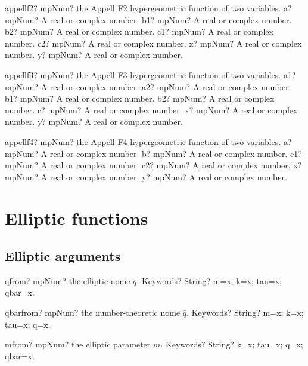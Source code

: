 \documentclass[12pt,a4paper,openany]{book}
\begin{document}
\begin{mpFunctionsExtract}
\mpFunctionSeven
{appellf2? mpNum? the Appell F2 hypergeometric function of two variables.}
{a? mpNum? A real or complex number.}
{b1? mpNum? A real or complex number.}
{b2? mpNum? A real or complex number.}
{c1? mpNum? A real or complex number.}
{c2? mpNum? A real or complex number.}
{x? mpNum? A real or complex number.}
{y? mpNum? A real or complex number.}
\end{mpFunctionsExtract}

\begin{mpFunctionsExtract}
\mpFunctionSeven
{appellf3? mpNum? the Appell F3 hypergeometric function of two variables.}
{a1? mpNum? A real or complex number.}
{a2? mpNum? A real or complex number.}
{b1? mpNum? A real or complex number.}
{b2? mpNum? A real or complex number.}
{c? mpNum? A real or complex number.}
{x? mpNum? A real or complex number.}
{y? mpNum? A real or complex number.}
\end{mpFunctionsExtract}

\begin{mpFunctionsExtract}
\mpFunctionSix
{appellf4? mpNum? the Appell F4 hypergeometric function of two variables.}
{a? mpNum? A real or complex number.}
{b? mpNum? A real or complex number.}
{c1? mpNum? A real or complex number.}
{c2? mpNum? A real or complex number.}
{x? mpNum? A real or complex number.}
{y? mpNum? A real or complex number.}
\end{mpFunctionsExtract}

\chapter{Elliptic functions}

\section{Elliptic arguments}

\begin{mpFunctionsExtract}
\mpFunctionOne
{qfrom? mpNum? the elliptic nome $q$.}
{Keywords? String? m=x; k=x; tau=x; qbar=x.}
\end{mpFunctionsExtract}

\begin{mpFunctionsExtract}
\mpFunctionOne
{qbarfrom? mpNum? the number-theoretic nome $\overline{q}$.}
{Keywords? String? m=x; k=x; tau=x; q=x.}
\end{mpFunctionsExtract}

\begin{mpFunctionsExtract}
\mpFunctionOne
{mfrom? mpNum? the elliptic parameter $m$.}
{Keywords? String? k=x; tau=x; q=x; qbar=x.}
\end{mpFunctionsExtract}
\end{document}
